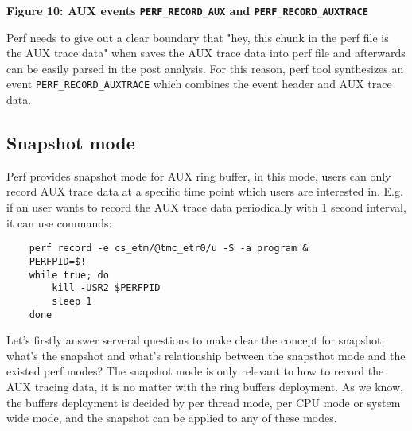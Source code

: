 \documentclass[11pt]{diazessay} %
\def\code#1{\texttt{#1}}
\begin{document}
\begin{center}
\par
\textbf{Figure 10: AUX events \code{PERF\_RECORD\_AUX} and \code{PERF\_RECORD\_AUXTRACE}}
\end{center}

Perf needs to give out a clear boundary that "hey, this chunk in the perf file is the AUX trace data" when saves the AUX trace data into perf file and afterwards can be easily parsed in the post analysis.  For this reason, perf tool synthesizes an event \code{PERF\_RECORD\_AUXTRACE} which combines the event header and AUX trace data.

\subsection*{Snapshot mode}

Perf provides snapshot mode for AUX ring buffer, in this mode, users can only record AUX trace data at a specific time point which users are interested in.  E.g. if an user wants to record the AUX trace data periodically with 1 second interval, it can use commands:

\begin{lstlisting}
	perf record -e cs_etm/@tmc_etr0/u -S -a program &
	PERFPID=$!
	while true; do
		kill -USR2 $PERFPID
		sleep 1
	done
\end{lstlisting}

Let's firstly answer serveral questions to make clear the concept for snapshot: what's the snapshot and what's relationship between the snapsthot mode and the existed perf modes?  The snapshot mode is only relevant to how to record the AUX tracing data, it is no matter with the ring buffers deployment.  As we know, the buffers deployment is decided by per thread mode, per CPU mode or system wide mode, and the snapshot can be applied to any of these modes.
\end{document}
